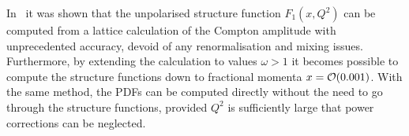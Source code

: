 In~\cite{Chambers:2017dov} it was shown that the unpolarised structure function $F_1(x,Q^2)$ can be computed from a lattice calculation of the Compton amplitude with unprecedented accuracy, devoid of any renormalisation and mixing issues. Furthermore, by extending the calculation to values $\omega > 1$ it becomes possible
to compute the structure functions down to fractional momenta $x = {\cal O}(0.001)$. With the same method, the PDFs can be computed directly without the need to go through the structure functions, provided $Q^2$ is sufficiently large that power corrections can be neglected. 




